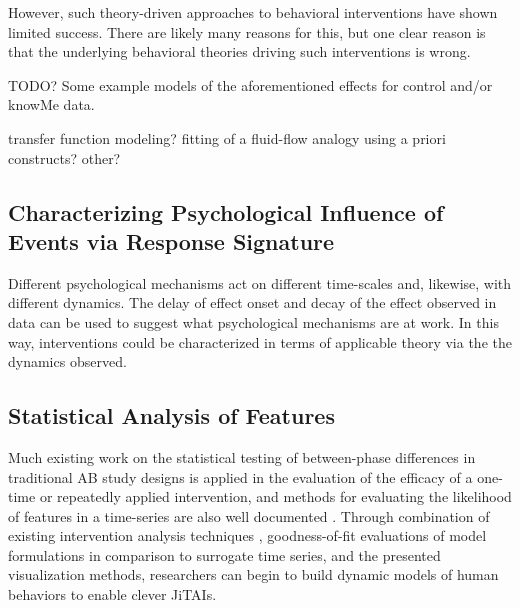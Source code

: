 However, such theory-driven approaches to  behavioral interventions have shown limited success. 
There are likely many reasons for this, but one clear reason is that the underlying behavioral theories driving such interventions is wrong.


TODO? Some example models of the aforementioned effects for control and/or knowMe data.

transfer function modeling?
fitting of a fluid-flow analogy using a priori constructs?
other?

\subsection{Characterizing Psychological Influence of Events via Response Signature}
Different psychological mechanisms act on different time-scales and, likewise, with different dynamics. 
The delay of effect onset and decay of the effect observed in data can be used to suggest what psychological mechanisms are at work.
In this way, interventions could be characterized in terms of applicable theory via the the dynamics observed.

\subsection{Statistical Analysis of Features}
Much existing work on the statistical testing of between-phase differences in traditional AB study designs \cite{parker2003} is applied in the evaluation of the efficacy of a one-time or repeatedly applied intervention, and methods for evaluating the likelihood of features in a time-series are also well documented \cite{gorman1996, suen1989}.
Through combination of existing intervention analysis techniques \cite{box1975}, goodness-of-fit evaluations of model formulations \cite{pankratz2012} in comparison to surrogate time series, and the presented visualization methods, researchers can begin to build dynamic models of human behaviors to enable clever JiTAIs.